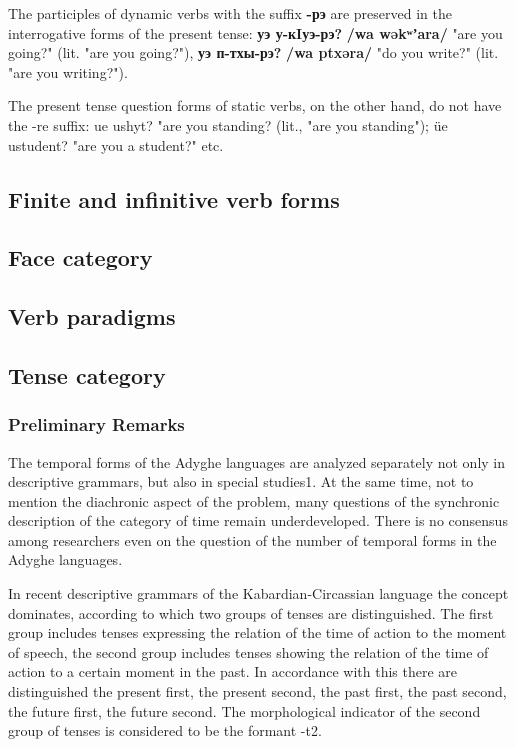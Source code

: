 \documentclass[a4paper,12pt]{book}
\newcommand{\1}[1]{\textbf{\emph{#1}}} %
\newcommand{\2}[1]{\textbf{[#1]}} %
\newcommand{\3}[1]{\fontsize{11pt}{0cm}\textbf{\emph{#1}}} %
\newcommand{\4}[1]{\fontsize{10pt}{0cm}\emph{#1}}	%
\newcommand{\5}[1]{\textbf{/#1/}} %
\newcommand{\6}[1]{\textbf{[#1]}} %
\newcommand{\7}[1]{\fontsize{12pt}{0cm}\emph{#1}} %
\newcommand{\8}[1]{\fontsize{12pt}{0cm}`#1'} %
\newcommand{\9}[1]{\fontsize{12pt}{0cm}(lit. `#1')} %
\newcommand{\glossphonemics}[1]{\textbf{/#1/}} %
\begin{document}
\begin{xlist}
The participles of dynamic verbs with the suffix \textbf{-рэ} are preserved in the interrogative forms of the present tense: \textbf{уэ у-кIуэ-рэ?} \glossphonemics{wa wəkʷʼara} "are you going?" (lit. "are you going?"), \textbf{уэ п-тхы-рэ?} \glossphonemics{wa ptxəra} "do you write?" (lit. "are you writing?").

The present tense question forms of static verbs, on the other hand, do not have the -re suffix: ue ushyt? "are you standing? (lit., "are you standing"); üe ustudent? "are you a student?" etc.
\end{xlist}

\subsection{Finite and infinitive verb forms}
\subsection{Face category}
\subsection{Verb paradigms}
\subsection{Tense category}
\subsubsection{Preliminary Remarks}
The temporal forms of the Adyghe languages are analyzed separately not only in descriptive grammars, but also in special studies1. At the same time, not to mention the diachronic aspect of the problem, many questions of the synchronic description of the category of time remain underdeveloped. There is no consensus among researchers even on the question of the number of temporal forms in the Adyghe languages.

In recent descriptive grammars of the Kabardian-Circassian language the concept dominates, according to which two groups of tenses are distinguished. The first group includes tenses expressing the relation of the time of action to the moment of speech, the second group includes tenses showing the relation of the time of action to a certain moment in the past. In accordance with this there are distinguished the present first, the present second, the past first, the past second, the future first, the future second. The morphological indicator of the second group of tenses is considered to be the formant -t2.
\end{document}
